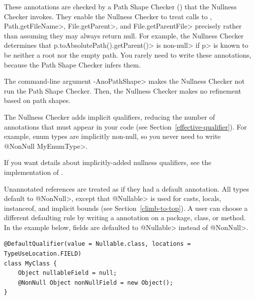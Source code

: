 These annotations are checked by a Path Shape Checker
() that the Nullness Checker
invokes.  They enable the Nullness Checker to treat calls to
,
\<Path.getFileName>, \<File.getParent>, and \<File.getParentFile>
precisely rather than assuming they may always return null.  For example,
the Nullness Checker determines that \<p.toAbsolutePath().getParent()> is
non-\<null> if \<p> is known to be neither a root nor the empty path.  You
rarely need to write these annotations, because the Path Shape Checker
infers them.

The command-line argument \<-AnoPathShape> makes the Nullness Checker not
run the Path Shape Checker.  Then, the Nullness Checker makes no refinement
based on path shapes.
\fi %




The Nullness Checker
adds implicit qualifiers, reducing the number of annotations that must
appear in your code (see Section~\ref{effective-qualifier}).
For example, enum types are implicitly non-null, so you never need to write
\<@NonNull MyEnumType>.

If you want details about implicitly-added nullness qualifiers, see the
implementation of .




Unannotated references are treated as if they had a default annotation.
All types default to
\<@NonNull>, except that \<@Nullable> is used for casts, locals,
instanceof, and implicit bounds (see Section~\ref{climb-to-top}).
A user can choose a different defaulting
rule by writing a  annotation on a
 package, class, or method.  In the example below, fields are defaulted to
\<@Nullable> instead of \<@NonNull>.

\begin{Verbatim}
@DefaultQualifier(value = Nullable.class, locations = TypeUseLocation.FIELD)
class MyClass {
    Object nullableField = null;
    @NonNull Object nonNullField = new Object();
}
\end{Verbatim}



